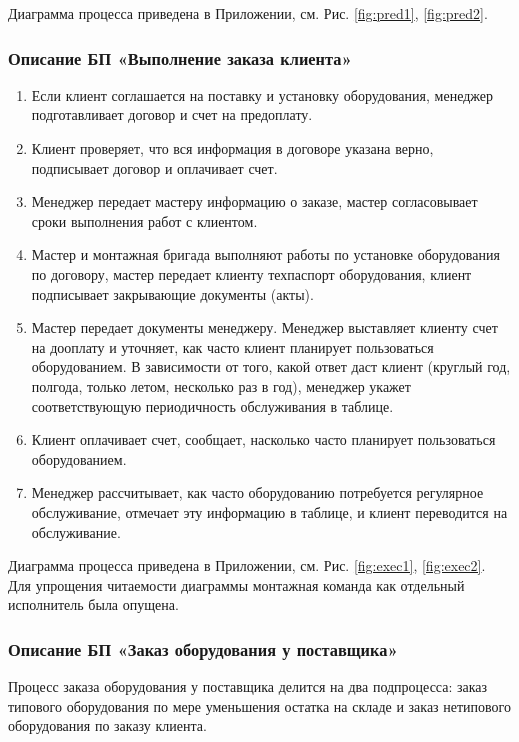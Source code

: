 \documentclass[a4paper,12pt]{article}
\begin{document}
Диаграмма процесса приведена в Приложении, см. Рис. \ref{fig:pred1}, \ref{fig:pred2}.

\subsubsection{Описание БП «Выполнение заказа клиента»}

\begin{enumerate}
    \item Если клиент соглашается на поставку и установку оборудования, менеджер подготавливает договор и счет на предоплату.
    \item Клиент проверяет, что вся информация в договоре указана верно, подписывает договор и оплачивает счет.
    \item Менеджер передает мастеру информацию о заказе, мастер согласовывает сроки выполнения работ с клиентом.
    \item Мастер и монтажная бригада выполняют работы по установке оборудования по договору, мастер передает клиенту техпаспорт оборудования, клиент подписывает закрывающие документы (акты).
    \item Мастер передает документы менеджеру. Менеджер выставляет клиенту счет на дооплату и уточняет, как часто клиент планирует пользоваться оборудованием. В зависимости от того, какой ответ даст клиент (круглый год, полгода, только летом, несколько раз в год), менеджер укажет соответствующую периодичность обслуживания в таблице.
    \item Клиент оплачивает счет, сообщает, насколько часто планирует пользоваться оборудованием. 
    \item Менеджер рассчитывает, как часто оборудованию потребуется регулярное обслуживание, отмечает эту информацию в таблице, и клиент переводится на обслуживание.
\end{enumerate}
       
Диаграмма процесса приведена в Приложении, см. Рис. \ref{fig:exec1}, \ref{fig:exec2}. Для упрощения читаемости диаграммы монтажная команда как отдельный исполнитель была опущена. 

\subsubsection{Описание БП «Заказ оборудования у поставщика»}

Процесс заказа оборудования у поставщика делится на два подпроцесса: заказ типового оборудования по мере уменьшения остатка на складе и заказ нетипового оборудования по заказу клиента.
\end{document}
